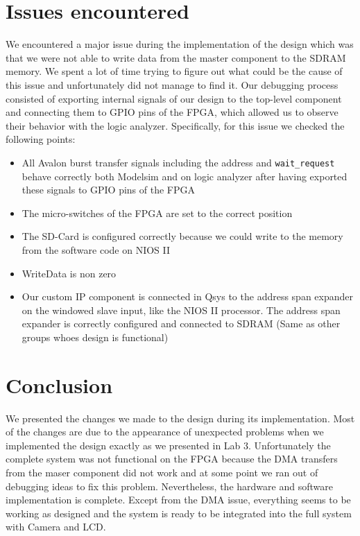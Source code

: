 \documentclass{article}
\begin{document}
\section{Issues encountered}
We encountered a major issue during the implementation of the design which was that we were not able to write data from the master component to the SDRAM memory.
We spent a lot of time trying to figure out what could be the cause of this issue and unfortunately did not manage to find it.
Our debugging process consisted of exporting internal signals of our design to the top-level component and connecting them to GPIO pins of the FPGA, which allowed us to observe their behavior with the logic analyzer.
Specifically, for this issue we checked the following points:

\begin{itemize}
  \item All Avalon burst transfer signals including the address and \verb'wait_request' behave correctly both Modelsim and on logic analyzer after having exported these signals to GPIO pins of the FPGA
  \item The micro-switches of the FPGA are set to the correct position
  \item The SD-Card is configured correctly because we could write to the memory from the software code on NIOS II \item WriteData is non zero
  \item Our custom IP component is connected in Qsys to the address span expander on the windowed slave input, like the NIOS II processor. The address span expander is correctly configured and connected to SDRAM (Same as other groups whoes design is functional)
\end{itemize}

 
\section{Conclusion}
We presented the changes we made to the design during its implementation.
Most of the changes are due to the appearance of unexpected problems when we implemented the design exactly as we presented in Lab 3.
Unfortunately the complete system was not functional on the FPGA because the DMA transfers from the maser component did not work and at some point we ran out of debugging ideas to fix this problem.
Nevertheless, the hardware and software implementation is complete.
Except from the DMA issue, everything seems to be working as designed and the system is ready to be integrated into the full system with Camera and LCD. 
\end{document}

